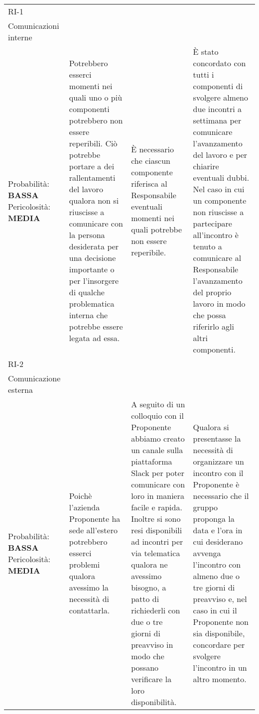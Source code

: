 \begin{longtable}{
		>{\centering}p{}
		>{\centering}p{}
		>{\centering}p{}
		>{\centering\arraybackslash}p{} }
	\rowcolor{lightRowColor}
	RI-1 \\ Comunicazioni interne \\
		\vspace{5mm} %
		Probabilità: \textbf{BASSA} Pericolosità: \textbf{MEDIA} &
		Potrebbero esserci momenti nei quali uno o più componenti potrebbero non essere reperibili. Ciò potrebbe portare a dei rallentamenti del lavoro qualora non si riuscisse a comunicare con la persona desiderata per una decisione importante o per l'insorgere di qualche problematica interna che potrebbe essere legata ad essa.
		&
		È necessario che ciascun componente riferisca al Responsabile eventuali momenti nei quali potrebbe non essere reperibile.
		&
		È stato concordato con tutti i componenti di svolgere almeno due incontri a settimana per comunicare l'avanzamento del lavoro e per chiarire eventuali dubbi. Nel caso in cui un componente non riuscisse a partecipare all'incontro è tenuto a comunicare al Responsabile l'avanzamento del proprio lavoro in modo che possa riferirlo agli altri componenti. \\

	\rowcolor{darkRowColor}
	RI-2 \\ Comunicazione esterna \\
		\vspace{5mm} %
		Probabilità: \textbf{BASSA} Pericolosità: \textbf{MEDIA} &
		Poichè l'azienda Proponente\ped{\textit{G}} ha sede all'estero potrebbero esserci problemi qualora avessimo la necessità di contattarla.
		&
		A seguito di un colloquio con il Proponente\ped{\textit{G}} abbiamo creato un canale sulla piattaforma Slack\ped{\textit{G}} per poter comunicare con loro in maniera facile e rapida. Inoltre si sono resi disponibili ad incontri per via telematica qualora ne avessimo bisogno, a patto di richiederli con due o tre giorni di preavviso in modo che possano verificare la loro disponibilità.
		&
		Qualora si presentasse la necessità di organizzare un incontro con il Proponente\ped{\textit{G}} è necessario che il gruppo proponga la data e l'ora in cui desiderano avvenga l'incontro con almeno due o tre giorni di preavviso e, nel caso in cui il Proponente\ped{\textit{G}} non sia disponibile, concordare per svolgere l'incontro in un altro momento. \\


\end{longtable}
